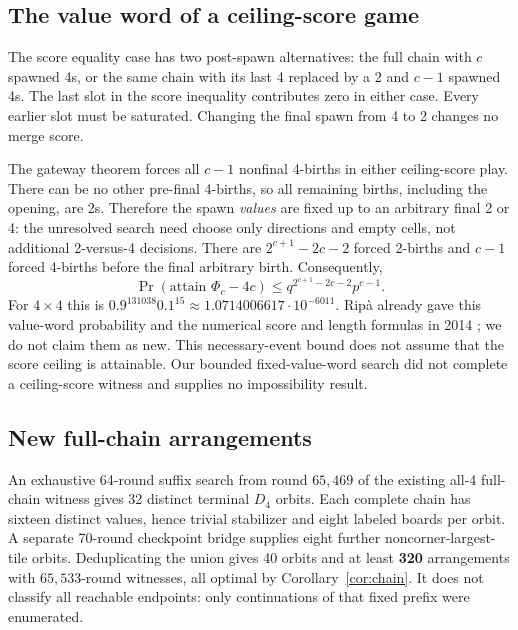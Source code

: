 \subsection{The value word of a ceiling-score game}

The score equality case has two post-spawn alternatives: the full chain
with $c$ spawned 4s, or the same chain with its last 4 replaced by a 2
and $c-1$ spawned 4s. The last slot in the score inequality contributes
zero in either case. Every earlier slot must be saturated. Changing
the final spawn from 4 to 2 changes no merge score.

The gateway theorem forces all $c-1$ nonfinal 4-births in either
ceiling-score play. There can be no other pre-final 4-births, so all
remaining births, including the opening, are 2s. Therefore the spawn
\emph{values} are fixed up to an arbitrary final 2 or 4: the unresolved
search need choose only directions and empty cells, not additional
2-versus-4 decisions. There are $2^{c+1}-2c-2$ forced 2-births and
$c-1$ forced 4-births before the final arbitrary birth. Consequently,
\[
 \Pr(\text{attain }\Phi_c-4c)
 \le q^{2^{c+1}-2c-2}p^{c-1}.
\]
For $4\times4$ this is
$0.9^{131038}0.1^{15}\approx1.0714006617\cdot10^{-6011}$.
Rip\`a already gave this value-word probability and the numerical
score and length formulas in 2014 \cite{ripa2014,ripaoeis2014}; we do
not claim them as new. This necessary-event bound does not assume that the score ceiling is
attainable. Our bounded fixed-value-word search did not complete a
ceiling-score witness and supplies no impossibility result.

\subsection{New full-chain arrangements}

An exhaustive 64-round suffix search from round $65{,}469$ of the
existing all-4 full-chain witness gives 32 distinct terminal $D_4$
orbits. Each complete chain has sixteen distinct values, hence trivial
stabilizer and eight labeled boards per orbit. A separate 70-round
checkpoint bridge supplies eight further noncorner-largest-tile orbits.
Deduplicating the union gives 40 orbits and at least
\textbf{320} arrangements with $65{,}533$-round witnesses, all optimal
by Corollary~\ref{cor:chain}. It does not classify all reachable endpoints:
only continuations of that fixed prefix were enumerated.

